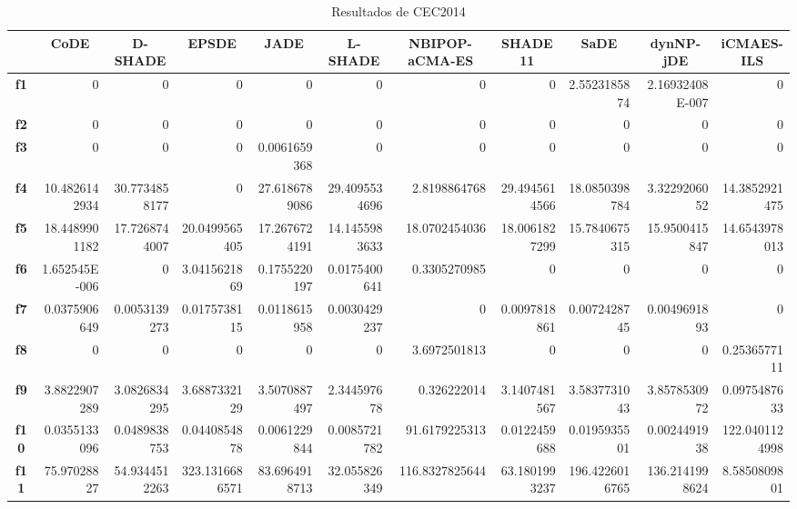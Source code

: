 \documentclass[a4paper,11pt]{article}
\begin{document}
  \begin{table}[H]
  \caption{Resultados de CEC2014}
   \begin{adjustbox}{width=1.15\textwidth}
  \centering
  \begin{tabular}{|c|r|r|r|r|r|r|r|r|r|r|}
  \hline
  \multicolumn{1}{|l|}{} & \multicolumn{1}{c|}{\textbf{CoDE}} & \multicolumn{1}{c|}{\textbf{D-SHADE}} & \multicolumn{1}{c|}{\textbf{EPSDE}} & \multicolumn{1}{c|}{\textbf{JADE}} & \multicolumn{1}{c|}{\textbf{L-SHADE}} & \multicolumn{1}{c|}{\textbf{NBIPOP-aCMA-ES}} & \multicolumn{1}{c|}{\textbf{SHADE11}} & \multicolumn{1}{c|}{\textbf{SaDE}} & \multicolumn{1}{c|}{\textbf{dynNP-jDE}} & \multicolumn{1}{c|}{\textbf{iCMAES-ILS}} \\ \hline
  \textbf{f1} & 0 & 0 & 0 & 0 & 0 & 0 & 0 & 2.5523185874 & 2.16932408E-007 & 0 \\ \hline
  \textbf{f2} & 0 & 0 & 0 & 0 & 0 & 0 & 0 & 0 & 0 & 0 \\ \hline
  \textbf{f3} & 0 & 0 & 0 & 0.0061659368 & 0 & 0 & 0 & 0 & 0 & 0 \\ \hline
  \textbf{f4} & 10.4826142934 & 30.7734858177 & 0 & 27.6186789086 & 29.4095534696 & 2.8198864768 & 29.4945614566 & 18.0850398784 & 3.3229206052 & 14.3852921475 \\ \hline
  \textbf{f5} & 18.4489901182 & 17.7268744007 & 20.0499565405 & 17.2676724191 & 14.1455983633 & 18.0702454036 & 18.0061827299 & 15.7840675315 & 15.9500415847 & 14.6543978013 \\ \hline
  \textbf{f6} & 1.652545E-006 & 0 & 3.0415621869 & 0.1755220197 & 0.0175400641 & 0.3305270985 & 0 & 0 & 0 & 0 \\ \hline
  \textbf{f7} & 0.0375906649 & 0.0053139273 & 0.0175738115 & 0.0118615958 & 0.0030429237 & 0 & 0.0097818861 & 0.0072428745 & 0.0049691893 & 0 \\ \hline
  \textbf{f8} & 0 & 0 & 0 & 0 & 0 & 3.6972501813 & 0 & 0 & 0 & 0.2536577111 \\ \hline
  \textbf{f9} & 3.8822907289 & 3.0826834295 & 3.6887332129 & 3.5070887497 & 2.344597678 & 0.326222014 & 3.1407481567 & 3.5837731043 & 3.8578530972 & 0.0975487633 \\ \hline
  \textbf{f10} & 0.0355133096 & 0.0489838753 & 0.0440854878 & 0.0061229844 & 0.0085721782 & 91.6179225313 & 0.0122459688 & 0.0195935501 & 0.0024491938 & 122.0401124998 \\ \hline
  \textbf{f11} & 75.97028827 & 54.9344512263 & 323.1316686571 & 83.6964918713 & 32.055826349 & 116.8327825644 & 63.1801993237 & 196.4226016765 & 136.2141998624 & 8.5850809801 \\ \hline

\end{tabular}
\end{adjustbox}
\end{table}
\end{document}
